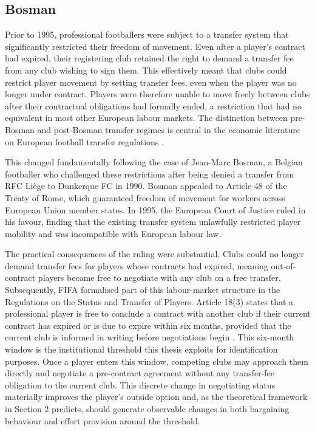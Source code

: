 \documentclass{article}
\begin{document}
\subsection{Bosman}

Prior to 1995, professional footballers were subject to a transfer system that significantly restricted their freedom of movement. Even after a player's contract had expired, their registering club retained the right to demand a transfer fee from any club wishing to sign them. This effectively meant that clubs could restrict player movement by setting transfer fees, even when the player was no longer under contract. Players were therefore unable to move freely between clubs after their contractual obligations had formally ended, a restriction that had no equivalent in most other European labour markets. The distinction between pre-Bosman and post-Bosman transfer regimes is central in the economic literature on European football transfer regulations \citep{feess_muehlheusser_2003}. \

This changed fundamentally following the case of Jean-Marc Bosman, a Belgian footballer who challenged these restrictions after being denied a transfer from RFC Liège to Dunkerque FC in 1990. Bosman appealed to Article 48 of the Treaty of Rome, which guaranteed freedom of movement for workers across European Union member states. In 1995, the European Court of Justice ruled in his favour, finding that the existing transfer system unlawfully restricted player mobility and was incompatible with European labour law. \

The practical consequences of the ruling were substantial. Clubs could no longer demand transfer fees for players whose contracts had expired, meaning out-of-contract players became free to negotiate with any club on a free transfer. Subsequently, FIFA formalised part of this labour-market structure in the Regulations on the Status and Transfer of Players. Article 18(3) states that a professional player is free to conclude a contract with another club if their current contract has expired or is due to expire within six months, provided that the current club is informed in writing before negotiations begin \citep{fifa_rstp_2025}. This six-month window is the institutional threshold this thesis exploits for identification purposes. Once a player enters this window, competing clubs may approach them directly and negotiate a pre-contract agreement without any transfer-fee obligation to the current club. This discrete change in negotiating status materially improves the player's outside option and, as the theoretical framework in Section 2 predicts, should generate observable changes in both bargaining behaviour and effort provision around the threshold.
\end{document}
